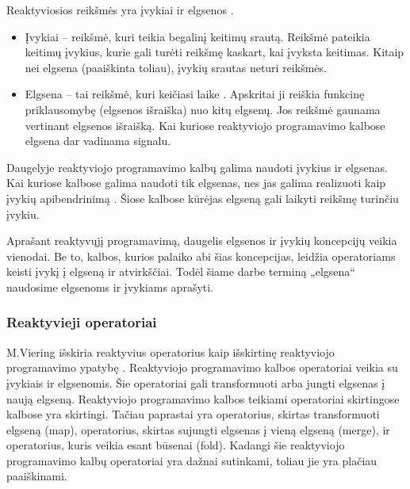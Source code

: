 Reaktyviosios reikšmės yra įvykiai ir elgsenos \cite{Bainomugisha:2013:SRP:2501654.2501666}.

\begin{itemize}
  \item Įvykiai – reikšmė, kuri teikia begalinį keitimų srautą. Reikšmė pateikia keitimų įvykius, kurie gali turėti reikšmę kaskart, kai įvyksta keitimas. Kitaip nei elgsena (paaiškinta toliau), įvykių srautas neturi reikšmės.
  \item Elgsena – tai reikšmė, kuri keičiasi laike \cite{ElliottHudak97:Fran}. Apskritai ji reiškia funkcinę priklausomybę (elgsenos išraiška) nuo kitų elgsenų. Jos reikšmė gaunama vertinant elgsenos išraišką. Kai kuriose reaktyviojo programavimo kalbose elgsena dar vadinama signalu.
\end{itemize}

Daugelyje reaktyviojo programavimo kalbų galima naudoti įvykius ir elgsenas. Kai kuriose kalbose galima naudoti tik elgsenas, nes jas galima realizuoti kaip įvykių apibendrinimą \cite{Wan2002:EventDrivenFRP, CzaplickiC13:FRPGUI}. Šiose kalbose kūrėjas elgseną gali laikyti reikšmę turinčiu įvykiu.

Aprašant reaktyvųjį programavimą, daugelis elgsenos ir įvykių koncepcijų veikia vienodai. Be to, kalbos, kurios palaiko abi šias koncepcijas, leidžia operatoriams keisti įvykį į elgseną ir atvirkščiai. Todėl šiame darbe terminą „elgsena“ naudosime elgsenoms ir įvykiams aprašyti.

\subsubsection{Reaktyvieji operatoriai}

M.Viering išskiria reaktyvius operatorius kaip išskirtinę reaktyviojo programavimo ypatybę \cite{RubyReactiveMaster}. Reaktyviojo programavimo kalbos operatoriai veikia su įvykiais ir elgsenomis. Šie operatoriai gali transformuoti arba jungti elgsenas į naują elgseną. Reaktyviojo programavimo kalbos teikiami operatoriai skirtingose kalbose yra skirtingi. Tačiau paprastai yra operatorius, skirtas transformuoti elgseną (map), operatorius, skirtas sujungti elgsenas į vieną elgseną (merge), ir operatorius, kuris veikia esant būsenai (fold). Kadangi šie reaktyviojo programavimo kalbų operatoriai yra dažnai sutinkami, toliau jie yra plačiau paaiškinami.

